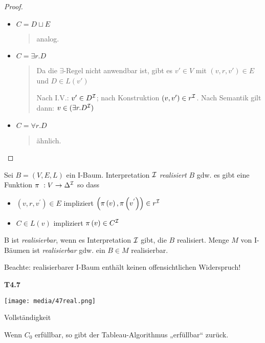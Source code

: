 \begin{proof}
\begin{itemize}
\item $C = D \sqcup E$

\begin{quote}
analog.
\end{quote}

\item $C = \exists r.D$

\begin{quote}
Da die $\exists$-Regel nicht anwendbar ist, gibt es $v'\in V$ mit $(v,r,v') \in E$ und $D \in L(v')$

Nach I.V.: $v' \in D^{\mathcal{I}}$; nach Konstruktion $(v,v') \in r^{\mathcal{I}}$. Nach Semantik gilt dann: $v \in (\exists r.D^{\mathcal{I}})$
\end{quote}

\item $C = \forall r.D$
\begin{quote}
ähnlich.
\end{quote}
\end{itemize}
\end{proof}

\begin{definition}[Realisierbarkeit]

Sei $B = \left( V,E,L \right)$ ein I-Baum. Interpretation $\mathcal{I}$
\emph{realisiert} $B$ gdw. es gibt eine Funktion
$\pi\ :V \rightarrow \Delta^{\mathcal{I}}$ so dass

\begin{itemize}
\item
  $\left( v,r,v^{'} \right) \in E$ impliziert
  $\left( \pi\left( v \right),\pi\left( v^{'} \right) \right) \in r^{\mathcal{I}}$
\item
  $C \in L\left( v \right)$ impliziert
  $\pi\left( v \right) \in C^{\mathcal{I}}$
\end{itemize}

B ist \emph{realisierbar}, wenn es Interpretation $\mathcal{I}$ gibt, die $B$
realisiert. Menge $M$ von I-Bäumen ist \emph{realisierbar} gdw. ein
$B \in M$ realisierbar.
\end{definition}

Beachte: realisierbarer I-Baum enthält keinen offensichtlichen Widerspruch!

\textbf{T4.7}

\texttt{[image: media/47real.png]}

\begin{proposition}{Vollständigkeit}

Wenn $C_{0}$ erfüllbar, so gibt der Tableau-Algorithmus „erfüllbar``
zurück.
\end{proposition}

